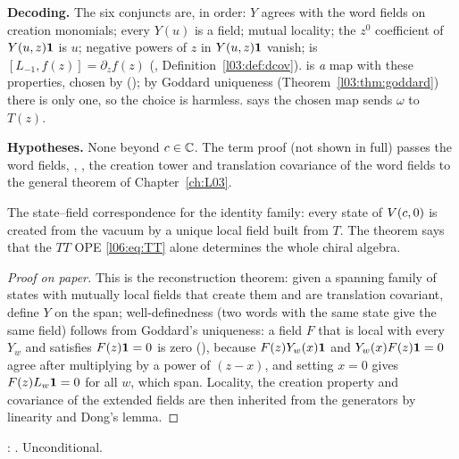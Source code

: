\begin{dictionary}
\textbf{Decoding.} The six conjuncts are, in order: $Y$ agrees with the word fields on creation
monomials; every $Y(u)$ is a field; mutual locality; the $z^0$ coefficient of $Y(u,z)\mathbf{1}$ is $u$;
negative powers of $z$ in $Y(u,z)\mathbf{1}$ vanish;  is
$[L_{-1},f(z)] = \partial_zf(z)$ (, Definition~\ref{l03:def:dcov}).
 is \emph{a} map with these properties, chosen by  ();
by Goddard uniqueness (Theorem~\ref{l03:thm:goddard}) there is only one, so the choice is harmless.
 says the chosen map sends $\omega$ to $T(z)$.

\textbf{Hypotheses.} None beyond $c\in{\mathbb{C}}$. The term proof (not shown in full) passes the word fields,
, , the creation tower and translation covariance of the
word fields to the general theorem \allowbreak{} of Chapter~\ref{ch:L03}.
\end{dictionary}

\begin{physics}
The state--field correspondence for the identity family: every state of $V(c,0)$ is created from the
vacuum by a unique local field built from $T$. The theorem says that the $TT$ OPE \eqref{l06:eq:TT}
alone determines the whole chiral algebra.
\end{physics}

\begin{proof}[Proof on paper]
This is the reconstruction theorem: given a spanning family of states with mutually local fields
that create them and are translation covariant, define $Y$ on the span; well-definedness (two words with
the same state give the same field) follows from Goddard's uniqueness: a field $F$ that is local with
every $Y_w$ and satisfies $F(z)\mathbf{1} = 0$ is zero (\allowbreak{}\allowbreak{}\allowbreak{}\allowbreak{}), because
$F(z)Y_w(x)\mathbf{1}$ and $Y_w(x)F(z)\mathbf{1} = 0$ agree after multiplying by a power of $(z-x)$, and setting
$x = 0$ gives $F(z)L_w\mathbf{1} = 0$ for all $w$, which span. Locality, the creation property and
covariance of the extended fields are then inherited from the generators by linearity and Dong's lemma.
\end{proof}

\begin{status}
\allowbreak{}\allowbreak{}\allowbreak{}: \lean{[propext, Classical.}\allowbreak{}\allowbreak\lean{sound]}. Unconditional.
\end{status}

